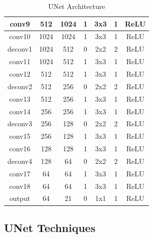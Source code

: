 \begin{table}[H]
\begin{tabular}{|c|c|c|c|c|c|c|}
		conv9          & 512         & 1024         & 1                & 3x3             & 1               & ReLU                \\ \hline
		conv10         & 1024        & 1024         & 1                & 3x3             & 1               & ReLU                \\ \hline
		deconv1        & 1024        & 512          & 0                & 2x2             & 2               & ReLU                \\ \hline
		conv11         & 1024        & 512          & 1                & 3x3             & 1               & ReLU                \\ \hline
		conv12         & 512         & 512          & 1                & 3x3             & 1               & ReLU                \\ \hline
		deconv2        & 512         & 256          & 0                & 2x2             & 2               & ReLU                \\ \hline
		conv13         & 512         & 256          & 1                & 3x3             & 1               & ReLU                \\ \hline
		conv14         & 256         & 256          & 1                & 3x3             & 1               & ReLU                \\ \hline
		deconv3        & 256         & 128          & 0                & 2x2             & 2               & ReLU                \\ \hline
		conv15         & 256         & 128          & 1                & 3x3             & 1               & ReLU                \\ \hline
		conv16         & 128         & 128          & 1                & 3x3             & 1               & ReLU                \\ \hline
		deconv4        & 128         & 64           & 0                & 2x2             & 2               & ReLU                \\ \hline
		conv17         & 64          & 64           & 1                & 3x3             & 1               & ReLU                \\ \hline
		conv18         & 64          & 64           & 1                & 3x3             & 1               & ReLU                \\ \hline
		output         & 64          & 21           & 0                & 1x1             & 1               & ReLU                \\ \hline
	\end{tabular}
	\caption{UNet Architecture}
\end{table}

\subsection*{UNet Techniques}
